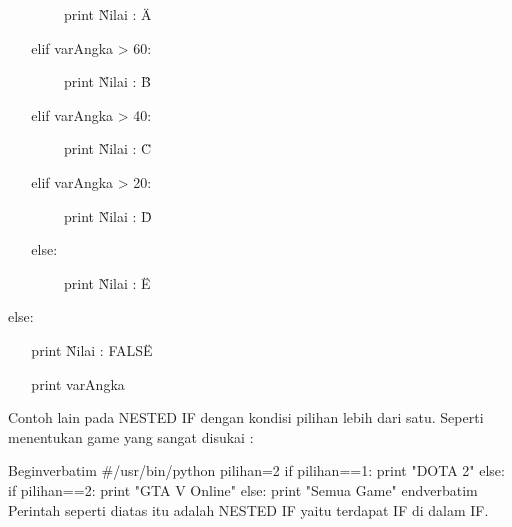 \vspace{12pt}
\noindent 
 $  $  $  $  $  $  $  $  $  $  $  $  $  $  $  $  $  $  $  $  $  $  $  $ print \"Nilai : A\" \par
\vspace{12pt}
\noindent 
 $  $  $  $  $  $  $  $  $  $  $  $elif varAngka > 60: \par
\vspace{12pt}
\noindent 
 $  $  $  $  $  $  $  $  $  $  $  $  $  $  $  $  $  $  $  $  $  $  $  $ print \"Nilai : B\" \par
\vspace{12pt}
\noindent 
 $  $  $  $  $  $  $  $  $  $  $  $elif varAngka > 40: \par
\vspace{12pt}
\noindent 
 $  $  $  $  $  $  $  $  $  $  $  $  $  $  $  $  $  $  $  $  $  $  $  $ print \"Nilai : C\" \par
\vspace{12pt}
\noindent 
 $  $  $  $  $  $  $  $  $  $  $  $elif varAngka > 20: \par
\vspace{12pt}
\noindent 
 $  $  $  $  $  $  $  $  $  $  $  $  $  $  $  $  $  $  $  $  $  $  $  $ print \"Nilai : D\" \par
\vspace{12pt}
\noindent 
 $  $  $  $  $  $  $  $  $  $  $  $else: \par
\vspace{12pt}
\noindent 
 $  $  $  $  $  $  $  $  $  $  $  $  $  $  $  $  $  $  $  $  $  $  $  $ print \"Nilai : E\" \par
\vspace{12pt}
\noindent 
else: \par
\vspace{12pt}
\noindent 
 $  $  $  $  $  $  $  $  $  $  $  $print \"Nilai : FALSE\" \par
\vspace{12pt}
\noindent 
 $  $  $  $  $  $  $  $  $  $  $  $print varAngka \par
\vspace{12pt}
\noindent
Contoh lain pada NESTED IF dengan kondisi pilihan lebih dari satu. Seperti menentukan game yang sangat disukai : \par
\vspace{12}
\noindent 
Begin{verbatim}
#/usr/bin/python
pilihan=2
if pilihan==1:
        print "DOTA 2"
else:
        if pilihan==2:
		print "GTA V Online"
	else:
		print "Semua Game"
end{verbatim}
\noindent
Perintah seperti diatas itu adalah NESTED IF yaitu terdapat IF di dalam IF. \par
